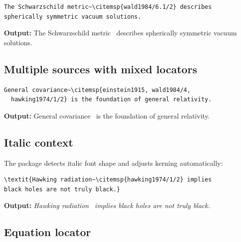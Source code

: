 \documentclass[11pt, a4paper]{article}
\begin{document}
\begin{tcolorbox}[colback=blue!3, colframe=blue!30, boxrule=0.5pt, arc=2pt, top=6pt, bottom=6pt, left=10pt, right=10pt]
\begin{verbatim}
The Schwarzschild metric~\citemsp{wald1984/6.1/2} describes
spherically symmetric vacuum solutions.
\end{verbatim}
\end{tcolorbox}

\noindent\textbf{Output:} The Schwarzschild metric~ describes spherically symmetric vacuum solutions.


\subsection{Multiple sources with mixed locators}

\begin{tcolorbox}[colback=blue!3, colframe=blue!30, boxrule=0.5pt, arc=2pt, top=6pt, bottom=6pt, left=10pt, right=10pt]
\begin{verbatim}
General covariance~\citemsp{einstein1915, wald1984/4,
  hawking1974/1/2} is the foundation of general relativity.
\end{verbatim}
\end{tcolorbox}

\noindent\textbf{Output:} General covariance~ is the foundation of general relativity.


\subsection{Italic context}

The package detects italic font shape and adjusts kerning automatically:

\begin{tcolorbox}[colback=blue!3, colframe=blue!30, boxrule=0.5pt, arc=2pt, top=6pt, bottom=6pt, left=10pt, right=10pt]
\begin{verbatim}
\textit{Hawking radiation~\citemsp{hawking1974/1/2} implies
black holes are not truly black.}
\end{verbatim}
\end{tcolorbox}

\noindent\textbf{Output:} \textit{Hawking radiation~ implies black holes are not truly black.}


\subsection{Equation locator}
\end{document}
